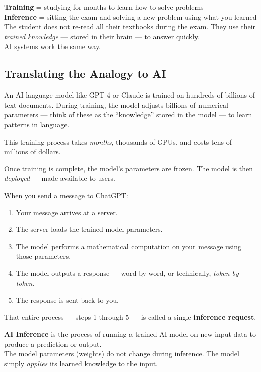 \documentclass[12pt, twoside, openright]{book}
\newcommand{\term}[1]{\textbf{\color{chaptercolor}#1}}
\begin{document}
\begin{analogybox}
\textbf{Training} = studying for months to learn how to solve problems\\[4pt]
\textbf{Inference} = sitting the exam and solving a new problem using
what you learned\\[6pt]
The student does not re-read all their textbooks during the exam.
They use their \textit{trained knowledge} --- stored in their brain ---
to answer quickly.\\[4pt]
AI systems work the same way.
\end{analogybox}

\subsection{Translating the Analogy to AI}

An AI language model like GPT-4 or Claude is trained on hundreds of
billions of text documents.
During training, the model adjusts billions of numerical parameters
--- think of these as the ``knowledge'' stored in the model ---
to learn patterns in language.

This training process takes \textit{months}, thousands of GPUs,
and costs tens of millions of dollars.

Once training is complete, the model's parameters are frozen.
The model is then \textit{deployed} --- made available to users.

When you send a message to ChatGPT:

\begin{enumerate}
  \item Your message arrives at a server.
  \item The server loads the trained model parameters.
  \item The model performs a mathematical computation on your message
        using those parameters.
  \item The model outputs a response --- word by word, or technically,
        \textit{token by token}.
  \item The response is sent back to you.
\end{enumerate}

That entire process --- steps 1 through 5 --- is called a single
\term{inference request}.

\begin{defbox}[AI Inference]
\textbf{AI Inference} is the process of running a trained AI model
on new input data to produce a prediction or output.\\[4pt]
The model parameters (weights) do not change during inference.
The model simply \textit{applies} its learned knowledge to the input.
\end{defbox}
\end{document}
